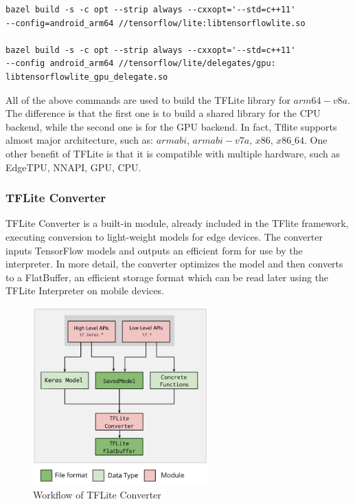 \begin{verbatim}
bazel build -s -c opt --strip always --cxxopt='--std=c++11'
--config=android_arm64 //tensorflow/lite:libtensorflowlite.so

bazel build -s -c opt --strip always --cxxopt='--std=c++11' 
--config android_arm64 //tensorflow/lite/delegates/gpu:
libtensorflowlite_gpu_delegate.so    
\end{verbatim}


All of the above commands are used to build the TFLite library for $arm64-v8a$. The difference is that the first one is to build a shared library for the CPU backend, while the second one is for the GPU backend. In fact, Tflite supports almost major architecture, such as: $armabi$, $armabi-v7a$, $x86$, $x86\_64$. One other benefit of TFLite is that it is compatible with multiple hardware, such as EdgeTPU, NNAPI,  GPU, CPU. \par

\subsubsection{TFLite Converter}\label{subsec:converter}

TFLite Converter is a built-in module, already included in the TFlite framework, executing conversion to light-weight models for edge devices. The converter inputs TensorFlow models and outputs an efficient form for use by the interpreter. In more detail, the converter optimizes the model and then converts to a FlatBuffer, an efficient storage format which can be read later using the TFLite Interpreter on mobile devices. \par

\begin{figure}[H]
    \centering
    \includegraphics[width=0.6\textwidth]{chapter2/image/tflite3.png}
    \caption{Workflow of TFLite Converter}
    \label{fig:tflite}
\end{figure}
 
